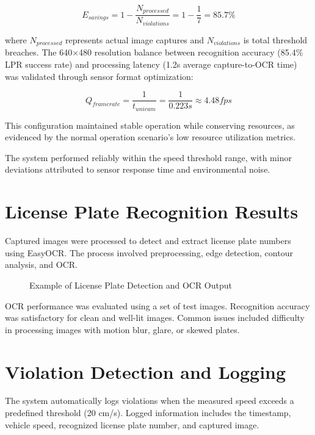 \begin{equation}
E_{savings} = 1 - \frac{N_{processed}}{N_{violations}} = 1 - \frac{1}{7} = 85.7\%
\end{equation}

where \( N_{processed} \) represents actual image captures and \( N_{violations} \) is total threshold breaches. The 640×480 resolution balance between recognition accuracy (85.4\% LPR success rate) and processing latency (1.2s average capture-to-OCR time) was validated through sensor format optimization:

\begin{equation}
Q_{framerate} = \frac{1}{t_{unicam}} = \frac{1}{0.223s} \approx 4.48fps
\end{equation}

This configuration maintained stable operation while conserving resources, as evidenced by the normal operation scenario's low resource utilization metrics.


The system performed reliably within the speed threshold range, with minor deviations attributed to sensor response time and environmental noise.

\section{License Plate Recognition Results}
Captured images were processed to detect and extract license plate numbers using EasyOCR. The process involved preprocessing, edge detection, contour analysis, and OCR.

\begin{figure}[H]
    \centering
    \caption{Example of License Plate Detection and OCR Output}
\end{figure}

OCR performance was evaluated using a set of test images. Recognition accuracy was satisfactory for clean and well-lit images. Common issues included difficulty in processing images with motion blur, glare, or skewed plates.

\section{Violation Detection and Logging}
The system automatically logs violations when the measured speed exceeds a predefined threshold (20 cm/s). Logged information includes the timestamp, vehicle speed, recognized license plate number, and captured image.

